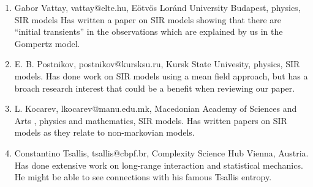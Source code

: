 \documentclass[11pt,a4paper,roman]{moderncv}
\begin{document}
\begin{enumerate}
\item Gabor Vattay, vattay@elte.hu, Eötvös Loránd University Budapest, physics, SIR models
Has written a paper on SIR models showing that there are ``initial transients'' in the observations which are explained by us in the Gompertz model.
\item E. B. Postnikov, postnikov@kursksu.ru, Kursk State Univesity, physics, SIR models.
Has done work on SIR models using a mean field approach, but has a broach research interest that could be a benefit when reviewing our paper.
\item L. Kocarev, lkocarev@manu.edu.mk, Macedonian Academy of Sciences and Arts
, physics and mathematics, SIR models.
Has written papers on SIR models as they relate to non-markovian models.
\item Constantino Tsallis, tsallis@cbpf.br, Complexity Science Hub Vienna, Austria. Has done extensive work on long-range interaction and statistical mechanics. He might be able to see connections with his famous Tsallis entropy.


\end{enumerate} 
\end{document}
